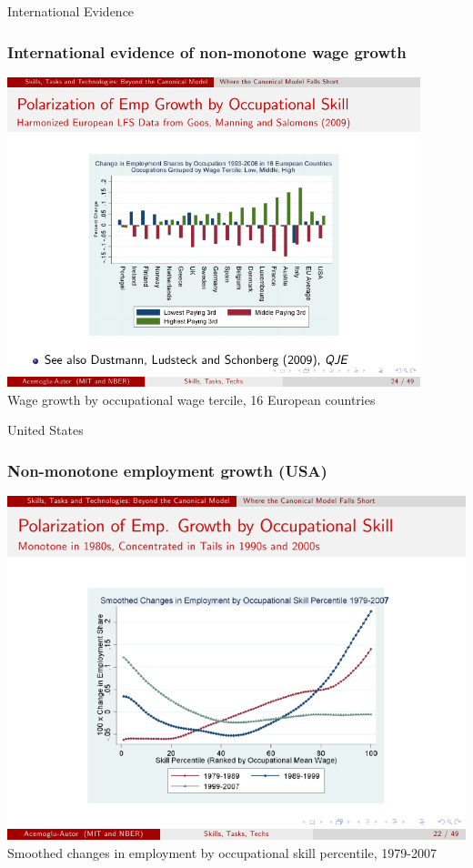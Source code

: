 \documentclass[red]{beamer}
\begin{document}
\begin{frame}[t]{International Evidence}
\frametitle{International evidence of non-monotone wage growth}
\begin{center}
\includegraphics[width=0.9\textwidth]{slides_fig/international_nonmonotone.pdf}
\\
Wage growth by occupational wage tercile, 16 European countries \citep{Acemoglu2011}
\end{center}
\end{frame}

\begin{frame}[t]{United States}
\frametitle{Non-monotone employment growth (USA)}
\begin{center}
\includegraphics[width=\textwidth]{slides_fig/emp_occ_skill_percentile.pdf}
\\
Smoothed changes in employment by occupational skill percentile, 1979-2007
\citep{Acemoglu2011}
\end{center}
\end{frame}
\end{document}
